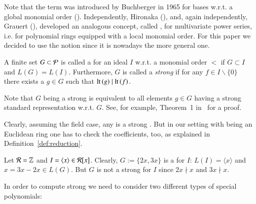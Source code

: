 \begin{convention}
Note that the term \emph{\gb} was introduced by Buchberger in 1965 for bases
w.r.t. a global monomial order (\cite{bGroebner1965, bGroebner1965eng}). Independently, Hironaka
(\cite{hironaka11964, hironaka21964}), and, again
independently, Grauert (\cite{grauert1972}), developed an analogous
concept, called \emph{\stb}, for multivariate power series, i.e. for polynomial
rings equipped with a local monomial order. For this paper we decided to use
the notion \emph{\stb} since it is nowadays the more general one.
\end{convention}

\begin{definition}
\label{def:strong-sb}
A finite set $G \subset \mathcal{P}$ is called a \emph{\stb} for an ideal $I$ w.r.t.
a monomial order $<$ if $G \subset I$ and $L(G) = L(I)$. Furthermore, $G$ is called a
\emph{strong \stb}
   if for any $f \in I\backslash\{0\}$ there exists a $g\in G$
such that $\operatorname{lt}\left({g}\right) \mid \operatorname{lt}\left({f}\right)$. 
\end{definition}

\begin{remark}
Note that $G$ being a strong \stb is equivalent to all elements $g \in G$ having
a strong standard representation w.r.t. $G$. See, for
example, Theorem~1 in~\cite{lichtblau2012} for a proof.
\end{remark}

Clearly, assuming the field case, any \stb is a strong \stb. But in our setting
with \er being an Euclidean ring one has to check the coefficients, too, as
explained in Definition~\ref{def:reduction}.

\begin{example}
\label{ex:stronggb}
Let $\mathcal{R} = \mathbb{Z}$ and $I= \langle x \rangle \in \mathcal{R}[x]$. Clearly, $G :=
\{2x,3x\}$ is a \stb for $I$: $L(I) = \langle x \rangle$ and $x = 3x-2x \in
L(G)$. But $G$ is not a strong \stb for $I$ since $2x \nmid
x$ and $3x \nmid x$.
\end{example}

In order to compute strong \stbs we need to consider two different types of
special polynomials:

